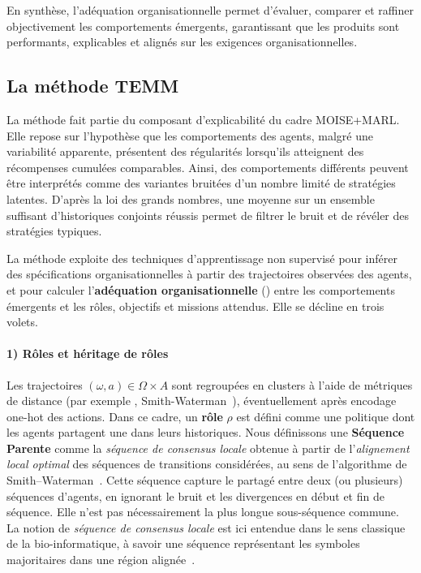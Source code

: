 En synthèse, l'adéquation organisationnelle permet d'évaluer, comparer et raffiner objectivement les comportements émergents, garantissant que les  produits sont performants, explicables et alignés sur les exigences organisationnelles.

\subsection{La méthode TEMM}
\label{sec:TEMM_algorithm}

La méthode  fait partie du composant d'explicabilité du cadre MOISE+MARL. Elle repose sur l'hypothèse que les comportements des agents, malgré une variabilité apparente, présentent des régularités lorsqu'ils atteignent des récompenses cumulées comparables. Ainsi, des comportements différents peuvent être interprétés comme des variantes bruitées d'un nombre limité de stratégies latentes. D'après la loi des grands nombres, une moyenne sur un ensemble suffisant d'historiques conjoints réussis permet de filtrer le bruit et de révéler des stratégies typiques.

La méthode exploite des techniques d'apprentissage non supervisé pour inférer des spécifications organisationnelles à partir des trajectoires observées des agents, et pour calculer l'\textbf{adéquation organisationnelle} () entre les comportements émergents et les rôles, objectifs et missions attendus. Elle se décline en trois volets.

\paragraph{1) Rôles et héritage de rôles}
Les trajectoires $(\omega, a) \in \Omega \times A$ sont regroupées en clusters à l'aide de métriques de distance (par exemple , Smith-Waterman~\cite{smith1981identification}), éventuellement après encodage one-hot des actions.
Dans ce cadre, un \textbf{rôle} $\rho$ est défini comme une politique dont les agents partagent une  dans leurs historiques.
Nous définissons une \textbf{Séquence Parente} comme la \textit{séquence de consensus locale} obtenue à partir de l'\textit{alignement local optimal} des séquences de transitions considérées, au sens de l'algorithme de Smith--Waterman~\cite{smith1981identification}.
Cette séquence capture le  partagé entre deux (ou plusieurs) séquences d'agents, en ignorant le bruit et les divergences en début et fin de séquence.
Elle n'est pas nécessairement la plus longue sous-séquence commune.
La notion de \textit{séquence de consensus locale} est ici entendue dans le sens classique de la bio-informatique, à savoir une séquence représentant les symboles majoritaires dans une région alignée~\cite{meshConsensusSequence,sternke2020consensus,schneider1990sequence}.

